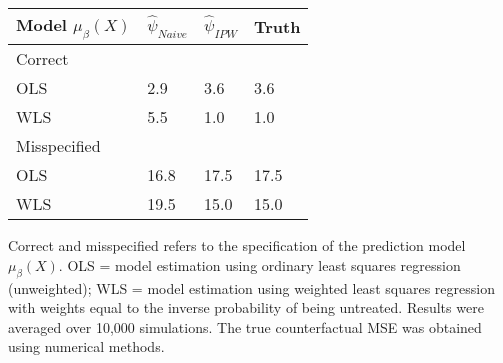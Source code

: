 \begin{table}[t]
    \centering
    \begin{threeparttable}
        \begin{tabular}{p{3cm}R{1.2cm}R{1.2cm}R{1.2cm}}
        \toprule
        Model $\mu_{\beta}(X)$ & $\widehat{\psi}_{Naive}$ & $\widehat{\psi}_{IPW}$ & Truth  \\
        \midrule
        Correct & & & \\
        \hspace{1em}OLS & 2.9 & 3.6 & 3.6\\
        \hspace{1em}WLS & 5.5 & 1.0 & 1.0\\
        \addlinespace[0.25em]
        Misspecified & & & \\
        \hspace{1em}OLS & 16.8 & 17.5 & 17.5\\
        \hspace{1em}WLS & 19.5 & 15.0 & 15.0\\
        \bottomrule
        \end{tabular}
        \begin{tablenotes}
        \item \noindent Correct and misspecified refers to the specification of the  prediction model $\mu_\beta(X)$. OLS = model estimation using ordinary least squares regression (unweighted); WLS = model estimation using weighted least squares regression with weights equal to the inverse probability of being untreated. Results were averaged over 10,000 simulations. The true counterfactual MSE was obtained using numerical methods. 
        \end{tablenotes}
        \end{threeparttable}
    
\end{table}

